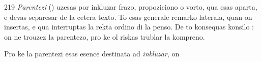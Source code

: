 \begin{VUpage}[223]{219}
\textit{Parentezi} () uzesas por inkluzar frazo, propoziciono o\nl
vorto, qua esas aparta, e devas separesar de la cetera texto.\nl
To esas generale remarko laterala, quan on insertas, e qua\nl
interruptas la rekta ordino di la penso. De to konsequas\nl
konsilo : on ne trouzez la parentezo, pro ke ol riskas trublar\nl
la kompreno.

Pro ke la parentezi esas esence destinata ad \textit{inkluzar}, on\nl
\end{VUpage}

%
%
%

